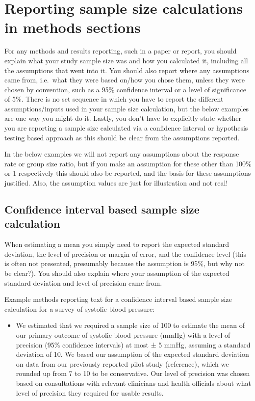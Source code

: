 \documentclass[
]{book}
\providecommand{\tightlist}{%
  \setlength{\itemsep}{0pt}\setlength{\parskip}{0pt}}
\begin{document}
\hypertarget{reporting-sample-size-calculations-in-methods-sections}{%
\section{Reporting sample size calculations in methods sections}\label{reporting-sample-size-calculations-in-methods-sections}}

For any methods and results reporting, such in a paper or report, you should explain what your study sample size was and how you calculated it, including all the assumptions that went into it. You should also report where any assumptions came from, i.e.~what they were based on/how you chose them, unless they were chosen by convention, such as a 95\% confidence interval or a level of significance of 5\%. There is no set sequence in which you have to report the different assumptions/inputs used in your sample size calculation, but the below examples are one way you might do it. Lastly, you don't have to explicitly state whether you are reporting a sample size calculated via a confidence interval or hypothesis testing based approach as this should be clear from the assumptions reported.

In the below examples we will not report any assumptions about the response rate or group size ratio, but if you make an assumption for these other than 100\% or 1 respectively this should also be reported, and the basis for these assumptions justified. Also, the assumption values are just for illustration and not real!

\hypertarget{confidence-interval-based-sample-size-calculation}{%
\subsection{Confidence interval based sample size calculation}\label{confidence-interval-based-sample-size-calculation}}

When estimating a mean you simply need to report the expected standard deviation, the level of precision or margin of error, and the confidence level (this is often not presented, presumably because the assumption is 95\%, but why not be clear?). You should also explain where your assumption of the expected standard deviation and level of precision came from.

Example methods reporting text for a confidence interval based sample size calculation for a survey of systolic blood pressure:

\begin{itemize}
\tightlist
\item
  We estimated that we required a sample size of 100 to estimate the mean of our primary outcome of systolic blood pressure (mmHg) with a level of precision (95\% confidence intervals) at most ± 5 mmHg, assuming a standard deviation of 10. We based our assumption of the expected standard deviation on data from our previously reported pilot study (reference), which we rounded up from 7 to 10 to be conservative. Our level of precision was chosen based on consultations with relevant clinicians and health officials about what level of precision they required for usable results.
\end{itemize}
\end{document}
